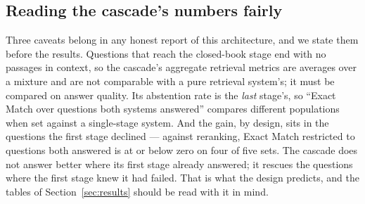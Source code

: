 \subsection{Reading the cascade's numbers fairly}
\label{sec:cascade-caveats}

Three caveats belong in any honest report of this architecture, and we
state them before the results. Questions that reach the closed-book stage
end with no passages in context, so the cascade's aggregate retrieval
metrics are averages over a mixture and are not comparable with a pure
retrieval system's; it must be compared on answer quality. Its abstention
rate is the \emph{last} stage's, so ``Exact Match over questions both
systems answered'' compares different populations when set against a
single-stage system. And the gain, by design, sits in the questions the
first stage declined --- against reranking, Exact Match restricted to
questions both answered is at or below zero on four of five sets. The
cascade does not answer better where its first stage already answered; it
rescues the questions where the first stage knew it had failed. That is
what the design predicts, and the tables of
Section~\ref{sec:results} should be read with it in mind.

